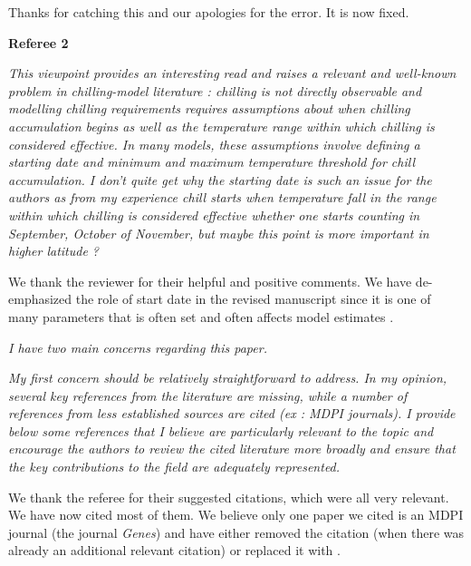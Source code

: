 \documentclass[11pt]{article}
\begin{document}
Thanks for catching this and our apologies for the error. It is now fixed. 


{\bf Referee 2} 

\emph{This viewpoint provides an interesting read and raises a relevant and well-known problem in chilling-model literature : chilling is not directly observable and modelling chilling requirements requires assumptions about when chilling accumulation begins as well as the temperature range within which chilling is considered effective. In many models, these assumptions involve defining a starting date and minimum and maximum temperature threshold for chill accumulation. I don’t quite get why the starting date is such an issue for the authors as from my experience chill starts when temperature fall in the range within which chilling is considered effective whether one starts counting in September, October of November, but maybe this point is more important in higher latitude ?}

We thank the reviewer for their helpful and positive comments. We have de-emphasized the role of start date in the revised manuscript since it is one of many parameters that is often set and often affects model estimates \citep[for more on start date see][]{egea2021reducing}.

\emph{I have two main concerns regarding this paper.}

\emph{My first concern should be relatively straightforward to address. In my opinion, several key references from the literature are missing, while a number of references from less established sources are cited (ex : MDPI journals). I provide below some references that I believe are particularly relevant to the topic and encourage the authors to review the cited literature more broadly and ensure that the key contributions to the field are adequately represented.}

We thank the referee for their suggested citations, which were all very relevant. We have now cited most of them. We believe only one paper we cited is an MDPI journal (the journal \emph{Genes}) and have either removed the citation (when there was already an additional relevant citation) or replaced it with \citet{pan2023epigenetic}. 
\end{document}
